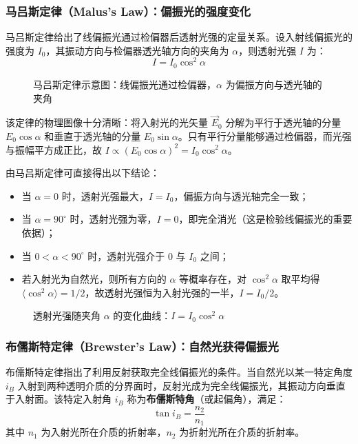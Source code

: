 \documentclass[UTF8]{ctexbook}
\begin{document}
\subsubsection{马吕斯定律（Malus's Law）：偏振光的强度变化}

马吕斯定律给出了线偏振光通过检偏器后透射光强的定量关系。设入射线偏振光的强度为 \(I_0\)，其振动方向与检偏器透光轴方向的夹角为 \(\alpha\)，则透射光强 \(I\) 为：
\[
I = I_0 \cos^2 \alpha
\]

\begin{figure}[htbp]
\centering
\caption{马吕斯定律示意图：线偏振光通过检偏器，\(\alpha\) 为偏振方向与透光轴的夹角}
\label{fig:malus_law}
\end{figure}

该定律的物理图像十分清晰：将入射光的光矢量 \(\vec{E}_0\) 分解为平行于透光轴的分量 \(E_0\cos\alpha\) 和垂直于透光轴的分量 \(E_0\sin\alpha\)。只有平行分量能够通过检偏器，而光强与振幅平方成正比，故 \(I \propto (E_0\cos\alpha)^2 = I_0\cos^2\alpha\)。

由马吕斯定律可直接得出以下结论：
\begin{itemize}
    \item 当 \(\alpha = 0\) 时，透射光强最大，\(I = I_0\)，偏振方向与透光轴完全一致；
    \item 当 \(\alpha = 90^\circ\) 时，透射光强为零，\(I = 0\)，即完全消光（这是检验线偏振光的重要依据）；
    \item 当 \(0 < \alpha < 90^\circ\) 时，透射光强介于 0 与 \(I_0\) 之间；
    \item 若入射光为自然光，则所有方向的 \(\alpha\) 等概率存在，对 \(\cos^2\alpha\) 取平均得 \(\langle\cos^2\alpha\rangle = 1/2\)，故透射光强恒为入射光强的一半，\(I = I_0/2\)。
\end{itemize}

\begin{figure}[htbp]
\centering
\caption{透射光强随夹角 \(\alpha\) 的变化曲线：\(I = I_0\cos^2\alpha\)}
\label{fig:malus_curve}
\end{figure}

\subsubsection{布儒斯特定律（Brewster's Law）：自然光获得偏振光}

布儒斯特定律指出了利用反射获取完全线偏振光的条件。当自然光以某一特定角度 \(i_B\) 入射到两种透明介质的分界面时，反射光成为完全线偏振光，其振动方向垂直于入射面。该特定入射角 \(i_B\) 称为\textbf{布儒斯特角}（或起偏角），满足：
\[
\tan i_B = \frac{n_2}{n_1}
\]
其中 \(n_1\) 为入射光所在介质的折射率，\(n_2\) 为折射光所在介质的折射率。
\end{document}
